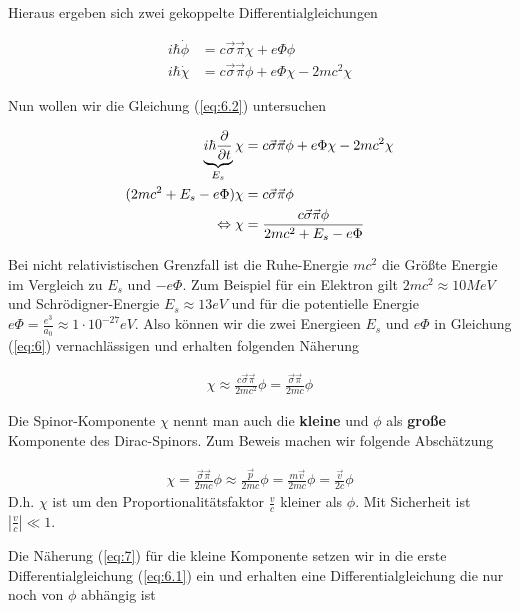 Hieraus ergeben sich zwei gekoppelte Differentialgleichungen

\begin{align}
  i\hbar\dot\phi &= c\vec\sigma\vec\pi\chi + e\Phi\phi  \label{eq:6.1}\\
i\hbar\dot\chi &= c\vec\sigma\vec\pi\phi +  e\Phi\chi - 2mc^2\chi  \label{eq:6.2}
\end{align}

Nun wollen wir die Gleichung (\ref{eq:6.2}) untersuchen

\begin{align}
  \label{eq:6}
 \underbr{ i\hbar\pdiff_t}_{E_s}\chi &= c\vec\sigma\vec\pi\phi + e\Phi \chi - 2mc^2\chi \notag\\
 (2mc^2+E_s-e\Phi )\chi &= c\vec\sigma\vec\pi\phi  \notag\\
\Leftrightarrow \chi&= \frac{c\vec\sigma\vec\pi\phi}{2mc^2+E_s-e\Phi}
\end{align}

Bei nicht relativistischen Grenzfall ist die Ruhe-Energie \(mc^2\) die Größte Energie im Vergleich zu \(E_s\) und \(-e\Phi\). Zum Beispiel für ein Elektron gilt \(2mc^2 \approx 10MeV\) und Schrödigner-Energie \(E_s\approx 13eV \) und für die potentielle Energie \(e\Phi=\frac{e^3}{a_0} \approx 1\cdot10^{-27}eV\). Also können wir die zwei Energieen \(E_s\) und \(e\Phi\)  in Gleichung (\ref{eq:6})  vernachlässigen und erhalten folgenden Näherung

\begin{align}
  \label{eq:7}
  \chi \approx \frac{c\vec\sigma\vec\pi}{2mc^2}\phi = \frac{\vec\sigma\vec\pi}{2mc}\phi
\end{align}

Die  Spinor-Komponente \(\chi\) nennt man auch die \textbf{kleine} und \(\phi\) als \textbf{große} Komponente des Dirac-Spinors. Zum Beweis machen wir folgende Abschätzung

\begin{align}
  \label{eq:9}
  \chi = \frac{\vec\sigma\vec\pi}{2mc}\phi \approx \frac{\vec p}{2mc}\phi = \frac{m \vec v}{2mc}\phi =  \frac{ \vec v}{2c}\phi
\end{align}
D.h. \(\chi\) ist um den Proportionalitätsfaktor \(\frac{v}{c}\) kleiner als \(\phi\). Mit Sicherheit ist \(|\frac{v}{c}| \ll 1\). 

Die Näherung (\ref{eq:7}) für die kleine Komponente setzen wir in die erste Differentialgleichung (\ref{eq:6.1})  ein und erhalten eine Differentialgleichung die nur noch von \(\phi\) abhängig ist


